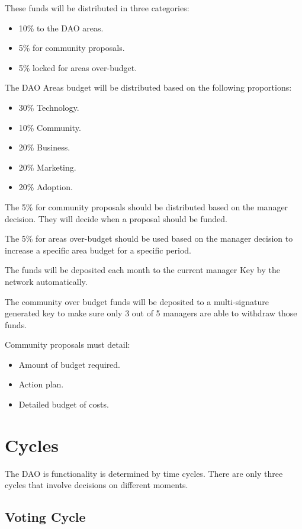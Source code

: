 \documentclass{article}
\begin{document}
These funds will be distributed in three categories:

\begin{itemize}
  \item 10\% to the DAO areas.
  \item 5\% for community proposals.
  \item 5\% locked for areas over-budget.
\end{itemize}

The DAO Areas budget will be distributed based on the following proportions:

\begin{itemize}
  \item 30\% Technology.
  \item 10\% Community.
  \item 20\% Business.
  \item 20\% Marketing.
  \item 20\% Adoption.
\end{itemize}

The 5\% for community proposals should be distributed based on the manager decision. They will decide when a proposal should be funded.

The 5\% for areas over-budget should be used based on the manager decision to increase a specific area budget for a specific period.

The funds will be deposited each month to the current manager Key by the network automatically.

The community  over budget funds will be deposited to a multi-signature generated key to make sure only 3 out of 5 managers are able to withdraw those funds.

Community proposals must detail:

\begin{itemize}
  \item Amount of budget required.
  \item Action plan.
  \item Detailed budget of costs.
\end{itemize}

\section{Cycles}

The DAO is functionality is determined by time cycles. There are only three cycles that involve decisions on different moments.

\subsection{Voting Cycle}
\end{document}
